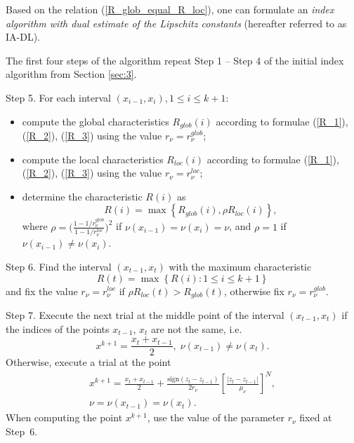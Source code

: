 \documentclass[twocolumn]{svjour3}          %
\begin{document}
	Based on the relation (\ref{R_glob_equal_R_loc}), one can formulate an \textit{index algorithm with dual estimate of the Lipschitz constants} (hereafter referred to as IA-DL).
	
	The first four steps of the algorithm repeat Step 1 -- Step 4 of the initial index algorithm from Section \ref{sec:3}.
	
	Step 5. For each interval $(x_{i-1}, x_i), 1 \leq i \leq k+1$: 
\begin{flushleft}
	\begin{itemize}
		\item compute the global characteristics $R_{glob}(i)$ according to formulae (\ref{R_1}), (\ref{R_2}), (\ref{R_3}) using the value $r_{\nu}=r_{\nu}^{glob}$;
		\item compute the local characteristics $R_{loc}(i)$ according to formulae (\ref{R_1}), (\ref{R_2}), (\ref{R_3}) using the value $r_{\nu}=r_{\nu}^{loc}$;
		\item determine the characteristic $R(i)$ as
\begin{equation}\label{R_max}
	R(i) = \max{\left\{ R_{glob}(i), \rho R_{loc}(i) \right\}},
\end{equation}
where $\rho=\Big(\frac{1-1/r_{\nu}^{glob}}{1-1/r_{\nu}^{loc}}\Big)^2$ if $\nu(x_{i-1})=\nu(x_i)=\nu$, and $\rho=1$ if $\nu(x_{i-1}) \neq \nu(x_i)$.
	\end{itemize}
\end{flushleft}

	Step 6. Find the interval $(x_{t-1}, x_t)$ with the maximum characteristic
\begin{equation}\label{R_max_t}
	R(t) = \max{\left\{ R(i): 1 \leq i \leq k+1\right\}}
\end{equation}
and fix the value $r_{\nu}=r_{\nu}^{loc}$ if $\rho R_{loc}(t) > R_{glob}(t)$, otherwise fix $r_{\nu}=r_{\nu}^{glob}$.

	Step 7. Execute the next trial at the middle point of the interval $(x_{t-1}, x_t)$ if the indices of the points $x_{t-1}$, $x_t$ are not the same, i.e.
$$
	x^{k+1} = \frac{x_t + x_{t-1}}{2}, \; \nu(x_{t-1}) \neq \nu(x_t).
$$
Otherwise, execute a trial at the point
\begin{eqnarray*}
	x^{k+1} = \frac{x_t+x_{t-1}}{2} + \frac{\mathrm{sign}(z_t-z_{t-1})}{2r_\nu}\left[\frac{\left|z_t-z_{t-1}\right|}{\mu_\nu}\right]^N, \\
	\nu = \nu(x_{t-1})=\nu(x_t).
\end{eqnarray*}
When computing the point $x^{k+1}$, use the value of the parameter $r_{\nu}$ fixed at Step~6. 
\end{document}

